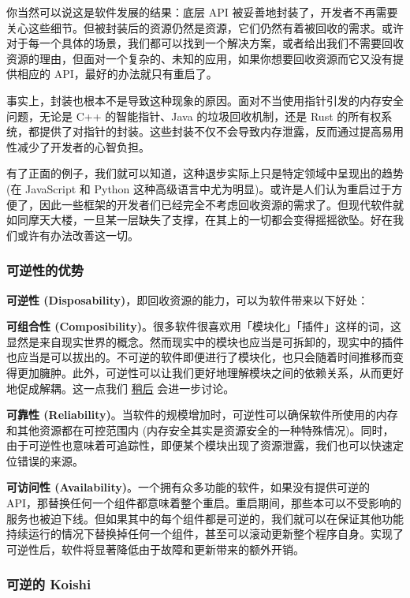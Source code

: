 \documentclass[
  chinese,
  11pt,
]{article}
\begin{document}
你当然可以说这是软件发展的结果：底层 API
被妥善地封装了，开发者不再需要关心这些细节。但被封装后的资源仍然是资源，它们仍然有着被回收的需求。或许对于每一个具体的场景，我们都可以找到一个解决方案，或者给出我们不需要回收资源的理由，但面对一个复杂的、未知的应用，如果你想要回收资源而它又没有提供相应的
API，最好的办法就只有重启了。

事实上，封装也根本不是导致这种现象的原因。面对不当使用指针引发的内存安全问题，无论是
C++ 的智能指针、Java 的垃圾回收机制，还是 Rust
的所有权系统，都提供了对指针的封装。这些封装不仅不会导致内存泄露，反而通过提高易用性减少了开发者的心智负担。

有了正面的例子，我们就可以知道，这种退步实际上只是特定领域中呈现出的趋势
(在 JavaScript 和 Python
这种高级语言中尤为明显)。或许是人们认为重启过于方便了，因此一些框架的开发者们已经完全不考虑回收资源的需求了。但现代软件就如同摩天大楼，一旦某一层缺失了支撑，在其上的一切都会变得摇摇欲坠。好在我们或许有办法改善这一切。

\subsubsection{可逆性的优势}\label{ux53efux9006ux6027ux7684ux4f18ux52bf}

\textbf{可逆性
(Disposability)}，即回收资源的能力，可以为软件带来以下好处：

\textbf{可组合性
(Composibility)}。很多软件很喜欢用「模块化」「插件」这样的词，这显然是来自现实世界的概念。然而现实中的模块也应当是可拆卸的，现实中的插件也应当是可以拔出的。不可逆的软件即便进行了模块化，也只会随着时间推移而变得更加臃肿。此外，可逆性可以让我们更好地理解模块之间的依赖关系，从而更好地促成解耦。这一点我们
\hyperref[compose]{稍后} 会进一步讨论。

\textbf{可靠性
(Reliability)}。当软件的规模增加时，可逆性可以确保软件所使用的内存和其他资源都在可控范围内
(内存安全其实是资源安全的一种特殊情况)。同时，由于可逆性也意味着可追踪性，即便某个模块出现了资源泄露，我们也可以快速定位错误的来源。

\textbf{可访问性
(Availability)}。一个拥有众多功能的软件，如果没有提供可逆的
API，那替换任何一个组件都意味着整个重启。重启期间，那些本可以不受影响的服务也被迫下线。但如果其中的每个组件都是可逆的，我们就可以在保证其他功能持续运行的情况下替换掉任何一个组件，甚至可以滚动更新整个程序自身。实现了可逆性后，软件将显著降低由于故障和更新带来的额外开销。

\subsubsection{可逆的 Koishi}\label{ux53efux9006ux7684-koishi}
\end{document}
